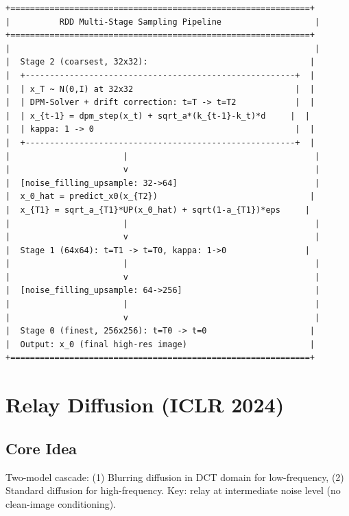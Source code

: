 \documentclass[11pt, a4paper]{article}
\begin{document}
\begin{lstlisting}[style=flowchart, caption={RDD Multi-Stage Sampling}]
+=============================================================+
|          RDD Multi-Stage Sampling Pipeline                   |
+=============================================================+
|                                                              |
|  Stage 2 (coarsest, 32x32):                                 |
|  +-------------------------------------------------------+  |
|  | x_T ~ N(0,I) at 32x32                                 |  |
|  | DPM-Solver + drift correction: t=T -> t=T2            |  |
|  | x_{t-1} = dpm_step(x_t) + sqrt_a*(k_{t-1}-k_t)*d     |  |
|  | kappa: 1 -> 0                                         |  |
|  +-------------------------------------------------------+  |
|                       |                                      |
|                       v                                      |
|  [noise_filling_upsample: 32->64]                            |
|  x_0_hat = predict_x0(x_{T2})                               |
|  x_{T1} = sqrt_a_{T1}*UP(x_0_hat) + sqrt(1-a_{T1})*eps     |
|                       |                                      |
|                       v                                      |
|  Stage 1 (64x64): t=T1 -> t=T0, kappa: 1->0                |
|                       |                                      |
|                       v                                      |
|  [noise_filling_upsample: 64->256]                           |
|                       |                                      |
|                       v                                      |
|  Stage 0 (finest, 256x256): t=T0 -> t=0                     |
|  Output: x_0 (final high-res image)                         |
+=============================================================+
\end{lstlisting}

\newpage
\section{Relay Diffusion (ICLR 2024)}

\subsection{Core Idea}
Two-model cascade: (1) Blurring diffusion in DCT domain for low-frequency, (2) Standard diffusion for high-frequency. Key: relay at intermediate noise level (no clean-image conditioning).
\end{document}
